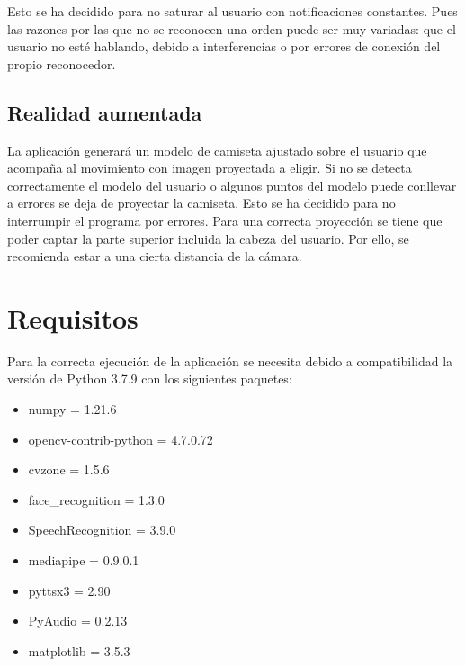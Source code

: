 \documentclass[twoside]{article}
\begin{document}
Esto se ha decidido para no saturar al usuario con notificaciones constantes. Pues las razones por las que no se reconocen una orden puede ser muy variadas: que el usuario no esté hablando, debido a interferencias o por errores de conexión del propio reconocedor.
\subsection{Realidad aumentada}
La aplicación generará un modelo de camiseta ajustado sobre el usuario que acompaña al movimiento con imagen proyectada a eligir. Si no se detecta correctamente el modelo del usuario o algunos puntos del modelo puede conllevar a errores se deja de proyectar la camiseta. Esto se ha decidido para no interrumpir el programa por errores. Para una correcta proyección se tiene que poder captar la parte superior incluida la cabeza del usuario. Por ello, se recomienda estar a una cierta distancia de la cámara.

\section{Requisitos}
Para la correcta ejecución de la aplicación se necesita debido a compatibilidad la versión de Python 3.7.9 con los siguientes paquetes:
\begin{itemize}
    \item numpy = 1.21.6
    \item opencv-contrib-python = 4.7.0.72
    \item cvzone = 1.5.6
    \item face\_recognition = 1.3.0
    \item SpeechRecognition = 3.9.0
    \item mediapipe = 0.9.0.1
    \item pyttsx3 = 2.90
    \item PyAudio = 0.2.13
    \item matplotlib = 3.5.3
\end{itemize}
\end{document}
